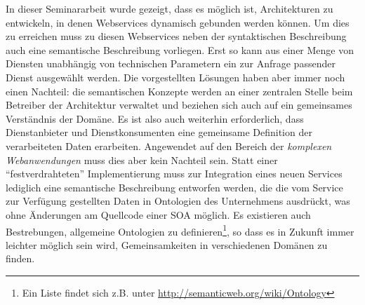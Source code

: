 In dieser Seminararbeit wurde gezeigt, dass es möglich ist, Architekturen zu entwickeln, in denen Webservices dynamisch gebunden werden können. Um dies zu erreichen muss zu diesen Webservices neben der syntaktischen Beschreibung auch eine semantische Beschreibung vorliegen. Erst so kann aus einer Menge von Diensten unabhängig von technischen Parametern ein zur Anfrage passender Dienst ausgewählt werden. Die vorgestellten Lösungen haben aber immer noch einen Nachteil: die semantischen Konzepte werden an einer zentralen Stelle beim Betreiber der Architektur verwaltet und beziehen sich auch auf ein gemeinsames Verständnis der Domäne. Es ist also auch weiterhin erforderlich, dass Dienstanbieter und Dienstkonsumenten eine gemeinsame Definition der verarbeiteten Daten erarbeiten. Angewendet auf den Bereich der \emph{komplexen Webanwendungen} muss dies aber kein Nachteil sein. Statt einer "`festverdrahteten"' Implementierung muss zur Integration eines neuen Services lediglich eine semantische Beschreibung entworfen werden, die die vom Service zur Verfügung gestellten Daten in Ontologien des Unternehmens ausdrückt, was ohne Änderungen am Quellcode einer \ac{SOA} möglich. Es existieren auch Bestrebungen, allgemeine Ontologien zu definieren\footnote{Ein Liste findet sich z.B. unter \url{http://semanticweb.org/wiki/Ontology}}, so dass es in Zukunft immer leichter möglich sein wird, Gemeinsamkeiten in verschiedenen Domänen zu finden.